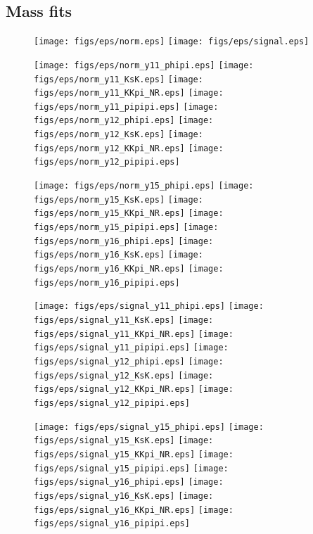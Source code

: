 \subsection{Mass fits}

\clearpage

\begin{figure}[h]
\texttt{[image: figs/eps/norm.eps]}
\texttt{[image: figs/eps/signal.eps]}
\caption{}
\label{fig:}
\end{figure}

\clearpage

\begin{figure}[h]
\texttt{[image: figs/eps/norm\_y11\_phipi.eps]}
\texttt{[image: figs/eps/norm\_y11\_KsK.eps]}
\texttt{[image: figs/eps/norm\_y11\_KKpi\_NR.eps]}
\texttt{[image: figs/eps/norm\_y11\_pipipi.eps]}
\texttt{[image: figs/eps/norm\_y12\_phipi.eps]}
\texttt{[image: figs/eps/norm\_y12\_KsK.eps]}
\texttt{[image: figs/eps/norm\_y12\_KKpi\_NR.eps]}
\texttt{[image: figs/eps/norm\_y12\_pipipi.eps]}
\caption{}
\label{fig:}
\end{figure}

\clearpage

\begin{figure}[h]
\texttt{[image: figs/eps/norm\_y15\_phipi.eps]}
\texttt{[image: figs/eps/norm\_y15\_KsK.eps]}
\texttt{[image: figs/eps/norm\_y15\_KKpi\_NR.eps]}
\texttt{[image: figs/eps/norm\_y15\_pipipi.eps]}
\texttt{[image: figs/eps/norm\_y16\_phipi.eps]}
\texttt{[image: figs/eps/norm\_y16\_KsK.eps]}
\texttt{[image: figs/eps/norm\_y16\_KKpi\_NR.eps]}
\texttt{[image: figs/eps/norm\_y16\_pipipi.eps]}
\caption{}
\label{fig:}
\end{figure}

\clearpage

\begin{figure}[h]
\texttt{[image: figs/eps/signal\_y11\_phipi.eps]}
\texttt{[image: figs/eps/signal\_y11\_KsK.eps]}
\texttt{[image: figs/eps/signal\_y11\_KKpi\_NR.eps]}
\texttt{[image: figs/eps/signal\_y11\_pipipi.eps]}
\texttt{[image: figs/eps/signal\_y12\_phipi.eps]}
\texttt{[image: figs/eps/signal\_y12\_KsK.eps]}
\texttt{[image: figs/eps/signal\_y12\_KKpi\_NR.eps]}
\texttt{[image: figs/eps/signal\_y12\_pipipi.eps]}
\caption{}
\label{fig:}
\end{figure}

\clearpage

\begin{figure}[h]
\texttt{[image: figs/eps/signal\_y15\_phipi.eps]}
\texttt{[image: figs/eps/signal\_y15\_KsK.eps]}
\texttt{[image: figs/eps/signal\_y15\_KKpi\_NR.eps]}
\texttt{[image: figs/eps/signal\_y15\_pipipi.eps]}
\texttt{[image: figs/eps/signal\_y16\_phipi.eps]}
\texttt{[image: figs/eps/signal\_y16\_KsK.eps]}
\texttt{[image: figs/eps/signal\_y16\_KKpi\_NR.eps]}
\texttt{[image: figs/eps/signal\_y16\_pipipi.eps]}
\caption{}
\label{fig:}
\end{figure}
